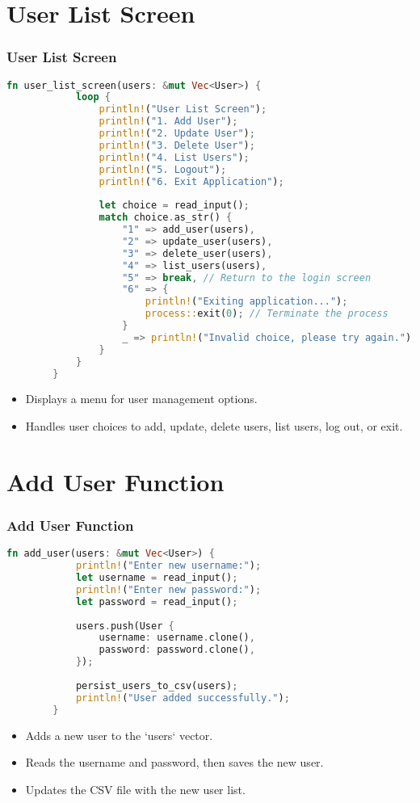 \documentclass[aspectratio=169, table]{beamer}
\begin{document}
\section{User List Screen}
\begin{frame}[fragile]
	\frametitle{User List Screen}
	\begin{lstlisting}[language=Rust]
		fn user_list_screen(users: &mut Vec<User>) {
			loop {
				println!("User List Screen");
				println!("1. Add User");
				println!("2. Update User");
				println!("3. Delete User");
				println!("4. List Users");
				println!("5. Logout");
				println!("6. Exit Application");
				
				let choice = read_input();
				match choice.as_str() {
					"1" => add_user(users),
					"2" => update_user(users),
					"3" => delete_user(users),
					"4" => list_users(users),
					"5" => break, // Return to the login screen
					"6" => {
						println!("Exiting application...");
						process::exit(0); // Terminate the process
					}
					_ => println!("Invalid choice, please try again."),
				}
			}
		}
	\end{lstlisting}
	\begin{itemize}
		\item Displays a menu for user management options.
		\item Handles user choices to add, update, delete users, list users, log out, or exit.
	\end{itemize}
\end{frame}

\section{Add User Function}
\begin{frame}[fragile]
	\frametitle{Add User Function}
	\begin{lstlisting}[language=Rust]
		fn add_user(users: &mut Vec<User>) {
			println!("Enter new username:");
			let username = read_input();
			println!("Enter new password:");
			let password = read_input();
			
			users.push(User {
				username: username.clone(),
				password: password.clone(),
			});
			
			persist_users_to_csv(users);
			println!("User added successfully.");
		}
	\end{lstlisting}
	\begin{itemize}
		\item Adds a new user to the `users` vector.
		\item Reads the username and password, then saves the new user.
		\item Updates the CSV file with the new user list.
	\end{itemize}
\end{frame}
\end{document}
